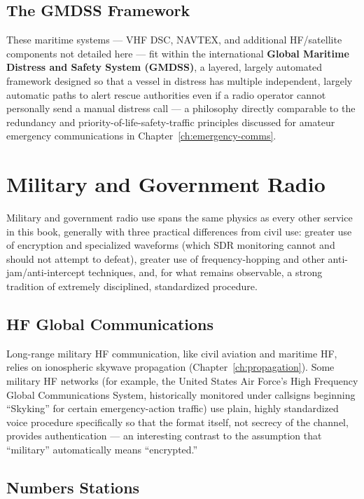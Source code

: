 \subsection{The GMDSS Framework}

These maritime systems --- VHF DSC, NAVTEX, and additional HF/satellite
components not detailed here --- fit within the international
\textbf{Global Maritime Distress and Safety System (GMDSS)}, a
layered, largely automated framework designed so that a vessel in
distress has multiple independent, largely automatic paths to alert
rescue authorities even if a radio operator cannot personally send a
manual distress call --- a philosophy directly comparable to the
redundancy and priority-of-life-safety-traffic principles discussed for
amateur emergency communications in Chapter~\ref{ch:emergency-comms}.

\section{Military and Government Radio}

Military and government radio use spans the same physics as every
other service in this book, generally with three practical differences
from civil use: greater use of encryption and specialized waveforms
(which SDR monitoring cannot and should not attempt to defeat), greater
use of frequency-hopping and other anti-jam/anti-intercept techniques,
and, for what remains observable, a strong tradition of extremely
disciplined, standardized procedure.

\subsection{HF Global Communications}

Long-range military HF communication, like civil aviation and maritime
HF, relies on ionospheric skywave propagation
(Chapter~\ref{ch:propagation}). Some military HF networks (for example,
the United States Air Force's High Frequency Global Communications
System, historically monitored under callsigns beginning ``Skyking'' for
certain emergency-action traffic) use plain, highly standardized voice
procedure specifically so that the format itself, not secrecy of the
channel, provides authentication --- an interesting contrast to the
assumption that ``military'' automatically means ``encrypted.''

\subsection{Numbers Stations}

